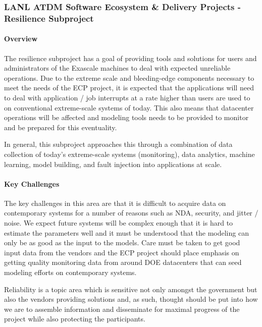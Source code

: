 \subsubsection{ LANL ATDM Software Ecosystem \& Delivery Projects - Resilience Subproject} 

\paragraph{Overview}
The resilience subproject has a goal of providing tools and solutions for
users and administrators of the Exascale machines to deal with expected
unreliable operations.  Due to the extreme scale and bleeding-edge components
necessary to meet the needs of the ECP project, it is expected that the
applications will need to deal with application / job interrupts at a rate
higher than users are used to on conventional extreme-scale systems of today.
This also means that datacenter operations will be affected and modeling tools
needs to be provided to monitor and be prepared for this eventuality.

In general, this subproject approaches this through a combination of data
collection of today's extreme-scale systems (monitoring), data analytics,
machine learning, model building, and fault injection into applications at
scale.

\paragraph{Key Challenges}
The key challenges in this area are that it is difficult to acquire data on
contemporary systems for a number of reasons such as NDA, security, and 
jitter / noise.  We expect future systems will be complex enough that it is
hard to estimate the parameters well and it must be understood that the
modeling can only be as good as the input to the models.  Care must be taken to
get good input data from the vendors and the ECP project should place emphasis
on getting quality monitoring data from around DOE datacenters that can seed
modeling efforts on contemporary systems.

Reliability is a topic area which is sensitive not only amongst the government
but also the vendors providing solutions and, as such, thought should be put
into how we are to assemble information and disseminate for maximal progress of
the project while also protecting the participants.

